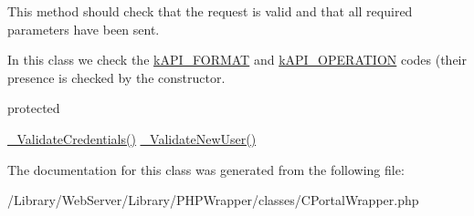 This method should check that the request is valid and that all required parameters have been sent.

In this class we check the \hyperlink{}{k\-A\-P\-I\-\_\-\-F\-O\-R\-M\-A\-T} and \hyperlink{}{k\-A\-P\-I\-\_\-\-O\-P\-E\-R\-A\-T\-I\-O\-N} codes (their presence is checked by the constructor.

protected

\hyperlink{class_c_portal_wrapper_a906c6d7d2de1b9758c19c7a2e94a268d}{\-\_\-\-Validate\-Credentials()}  \hyperlink{class_c_portal_wrapper_aaaa774d63578e176bd3f164736e832eb}{\-\_\-\-Validate\-New\-User()} 

The documentation for this class was generated from the following file\-:\begin{DoxyCompactItemize}
\item 
/\-Library/\-Web\-Server/\-Library/\-P\-H\-P\-Wrapper/classes/C\-Portal\-Wrapper.\-php\end{DoxyCompactItemize}
